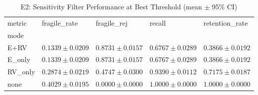 \begin{table}
\caption{E2: Sensitivity Filter Performance at Best Threshold (mean $\pm$ 95\% CI)}
\label{tab:e2_stats}
\begin{tabular}{lllll}
\toprule
metric & fragile_rate & fragile_rej & recall & retention_rate \\
mode &  &  &  &  \\
\midrule
E+RV & $0.1339 \pm 0.0209$ & $0.8731 \pm 0.0157$ & $0.6767 \pm 0.0289$ & $0.3866 \pm 0.0192$ \\
E_only & $0.1339 \pm 0.0209$ & $0.8731 \pm 0.0157$ & $0.6767 \pm 0.0289$ & $0.3866 \pm 0.0192$ \\
RV_only & $0.2874 \pm 0.0219$ & $0.4747 \pm 0.0300$ & $0.9390 \pm 0.0112$ & $0.7175 \pm 0.0187$ \\
none & $0.4029 \pm 0.0195$ & $0.0000 \pm 0.0000$ & $1.0000 \pm 0.0000$ & $1.0000 \pm 0.0000$ \\
\bottomrule
\end{tabular}
\end{table}
